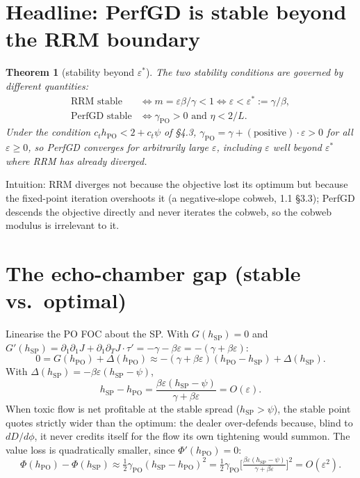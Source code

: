 \documentclass[11pt]{article}
\newtheorem{theorem}{Theorem}
\newcommand{\eps}{\varepsilon}
\newcommand{\hSP}{h_{\mathrm{SP}}}
\newcommand{\hPO}{h_{\mathrm{PO}}}
\newcommand{\gPO}{\gamma_{\mathrm{PO}}}
\begin{document}
\section{Headline: PerfGD is stable beyond the RRM boundary}

\begin{theorem}[stability beyond $\eps^*$]\label{thm:beyond}
The two stability conditions are governed by different quantities:
%
\begin{align*}
  \text{RRM stable} &\iff m=\eps\beta/\gamma<1 \iff \eps<\eps^*:=\gamma/\beta,\\
  \text{PerfGD stable} &\iff \gPO>0 \text{ and } \eta<2/L.
\end{align*}
%
Under the condition $c_t\hPO<2+c_t\psi$ of \S4.3,
$\gPO=\gamma+(\text{positive})\cdot\eps>0$ for all $\eps\ge 0$, so PerfGD converges
for arbitrarily large $\eps$, including $\eps$ well beyond $\eps^*$ where RRM has
already diverged.
\end{theorem}
%
Intuition: RRM diverges not because the objective lost its optimum but because
the fixed-point iteration overshoots it (a negative-slope cobweb, 1.1 \S3.3);
PerfGD descends the objective directly and never iterates the cobweb, so the
cobweb modulus is irrelevant to it.

\section{The echo-chamber gap (stable vs.\ optimal)}

Linearise the PO FOC about the SP. With $G(\hSP)=0$ and
$G'(\hSP)=\partial_1\partial_1 J + \partial_1\partial_T J\cdot\tau'
= -\gamma-\beta\eps = -(\gamma+\beta\eps)$:
%
\begin{equation*}
  0 = G(\hPO)+\Delta(\hPO)
  \approx -(\gamma+\beta\eps)(\hPO-\hSP) + \Delta(\hSP).
\end{equation*}
%
With $\Delta(\hSP)=-\beta\eps(\hSP-\psi)$,
%
\begin{equation}\label{eq:decisiongap}
  \boxed{\;
  \hSP - \hPO = \frac{\beta\eps(\hSP-\psi)}{\gamma+\beta\eps} = O(\eps).
  \;}
\end{equation}
%
When toxic flow is net profitable at the stable spread ($\hSP>\psi$), the stable
point quotes strictly wider than the optimum: the dealer over-defends because,
blind to $dD/d\phi$, it never credits itself for the flow its own tightening
would summon. The value loss is quadratically smaller, since $\Phi'(\hPO)=0$:
%
\begin{equation}\label{eq:valuegap}
  \boxed{\;
  \Phi(\hPO)-\Phi(\hSP) \approx \tfrac12\gPO(\hSP-\hPO)^2
  = \tfrac12\gPO\Big[\tfrac{\beta\eps(\hSP-\psi)}{\gamma+\beta\eps}\Big]^2 = O(\eps^2).
  \;}
\end{equation}
\end{document}
